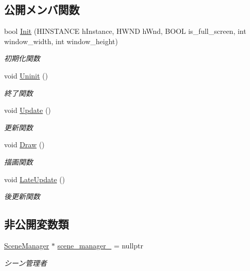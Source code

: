 \subsection*{公開メンバ関数}
\begin{DoxyCompactItemize}
\item 
bool \mbox{\hyperlink{class_game_system_ad4c08500b98490e00ce87a770bb5e981}{Init}} (H\+I\+N\+S\+T\+A\+N\+CE h\+Instance, H\+W\+ND h\+Wnd, B\+O\+OL is\+\_\+full\+\_\+screen, int window\+\_\+width, int window\+\_\+height)
\begin{DoxyCompactList}\small\item\em 初期化関数 \end{DoxyCompactList}\item 
void \mbox{\hyperlink{class_game_system_af76866bd03b84dca6880f1493fd3c9d1}{Uninit}} ()
\begin{DoxyCompactList}\small\item\em 終了関数 \end{DoxyCompactList}\item 
void \mbox{\hyperlink{class_game_system_ab0add1f2bd97d3b125a5682f571053a3}{Update}} ()
\begin{DoxyCompactList}\small\item\em 更新関数 \end{DoxyCompactList}\item 
void \mbox{\hyperlink{class_game_system_a474db0066b23d39e94e0a830140edce5}{Draw}} ()
\begin{DoxyCompactList}\small\item\em 描画関数 \end{DoxyCompactList}\item 
void \mbox{\hyperlink{class_game_system_aa416827abc995e1b8df4a5cf87911baf}{Late\+Update}} ()
\begin{DoxyCompactList}\small\item\em 後更新関数 \end{DoxyCompactList}\end{DoxyCompactItemize}
\subsection*{非公開変数類}
\begin{DoxyCompactItemize}
\item 
\mbox{\hyperlink{class_scene_manager}{Scene\+Manager}} $\ast$ \mbox{\hyperlink{class_game_system_ac398ab7a013177879fd3dd9a9f8d7e48}{scene\+\_\+manager\+\_\+}} = nullptr
\begin{DoxyCompactList}\small\item\em シーン管理者 \end{DoxyCompactList}\end{DoxyCompactItemize}


